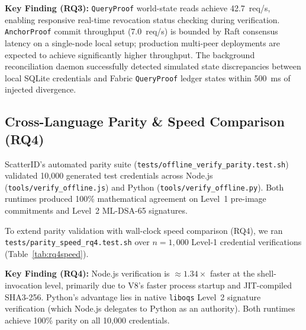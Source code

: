 \documentclass[5p,times,authoryear]{elsarticle}
\begin{document}
\textbf{Key Finding (RQ3):} \texttt{QueryProof} world-state reads achieve 42.7~req/s, enabling responsive real-time revocation status checking during verification. \texttt{AnchorProof} commit throughput (7.0~req/s) is bounded by Raft consensus latency on a single-node local setup; production multi-peer deployments are expected to achieve significantly higher throughput. The background reconciliation daemon successfully detected simulated state discrepancies between local SQLite credentials and Fabric \texttt{QueryProof} ledger states within 500~ms of injected divergence.

\subsection{Cross-Language Parity \& Speed Comparison (RQ4)}
\label{sec:rq4}
ScatterID's automated parity suite (\texttt{tests/offline\_verify\_parity.test.sh}) validated 10,000 generated test credentials across Node.js (\texttt{tools/verify\_offline.js}) and Python (\texttt{tools/verify\_offline.py}). Both runtimes produced 100\% mathematical agreement on Level~1 pre-image commitments and Level~2 ML-DSA-65 signatures.

To extend parity validation with wall-clock speed comparison (RQ4), we ran \texttt{tests/parity\_speed\_rq4.test.sh} over $n = 1{,}000$ Level-1 credential verifications (Table~\ref{tab:rq4speed}).

\begin{table}[t]
\centering
\caption{Cross-language offline verification speed comparison ($n = 1{,}000$ Level-1 credentials). Shell-level overhead is included in wall-clock measurements; pure cryptographic operation overhead would be lower.}
\label{tab:rq4speed}
\end{table}

\textbf{Key Finding (RQ4):} Node.js verification is $\approx 1.34\times$ faster at the shell-invocation level, primarily due to V8's faster process startup and JIT-compiled SHA3-256. Python's advantage lies in native \texttt{liboqs} Level~2 signature verification (which Node.js delegates to Python as an authority). Both runtimes achieve 100\% parity on all 10,000 credentials.
\end{document}
